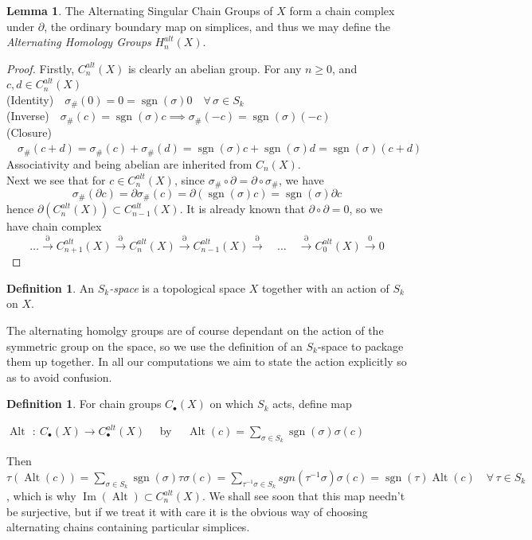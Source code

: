 \documentclass[11pt,a4paper,twoside]{article}
\theoremstyle{plain}
\theoremstyle{definition}
\newtheorem{defn}[thm]{Definition}
\theoremstyle{definition}
\newtheorem{lemma}[thm]{Lemma}
\theoremstyle{definition}
\theoremstyle{definition}
\theoremstyle{definition}
\DeclareMathOperator{\Ima}{Im}
\DeclareMathOperator{\co}{\!\colon\!}
\DeclareMathOperator{\Alt}{Alt}
\DeclareMathOperator{\sgn}{sgn}
\begin{document}
\begin{lemma}
\label{AlternatingSingularChainComplex}
The Alternating Singular Chain Groups of $X$ form a chain complex under $\partial$, the ordinary boundary map on simplices, and thus we may define the \emph{ Alternating Homology Groups} 
$H_{n}^{alt}(X)$.
\end{lemma}
\begin{proof}
Firstly, $C_n^{alt}(X)$ is clearly an abelian group. For any $n\geq0$, and $c,d\in C_n^{alt}(X)$\\
(Identity)$\quad\sigma_\#(0) = 0 = \sgn(\sigma) 0 \quad \forall \,\sigma \in S_k$ \\
(Inverse)$\quad\sigma_\#(c) = \sgn(\sigma)c  \implies \sigma_\#(-c) = \sgn(\sigma)(-c)$ \\
(Closure)$\quad\sigma_\#(c+d) = \sigma_\#(c) + \sigma_\#(d) = \sgn(\sigma)c + \sgn(\sigma)d = \sgn(\sigma)(c+d)$\\
Associativity and being abelian are inherited from $C_n(X)$.\\
Next we see that for $c \in C_n^{alt}(X)$, since $\sigma_\# \circ \partial = \partial \circ \sigma_\#$, we have 
$$\sigma_\#(\partial c) = \partial \sigma_\#(c) = \partial (\sgn(\sigma)c) = \sgn(\sigma)\partial c$$
hence $\partial(C_n^{alt}(X)) \subset C_{n-1}^{alt}(X)$. It is already known that $\partial \circ \partial = 0$, so we have chain complex
$$\dots \overset{\partial}{\longrightarrow}C_{n+1}^{alt}(X)\overset{\partial}{\longrightarrow}C_{n}^{alt}(X)\overset{\partial}{\longrightarrow}C_{n-1}^{alt}(X)\overset{\partial}{\longrightarrow}\quad \dots \quad \overset{\partial}{\longrightarrow}C_0^{alt}(X)\overset{0}{\longrightarrow}0$$
\end{proof}
\begin{defn}
An \emph{$S_k$-space} is a topological space $X$ together with an action of $S_k$ on $X$.
\end{defn}
The alternating homolgy groups are of course dependant on the action of the symmetric group on the space, so we use the definition of an $S_k$-space to package them up together. In all our computations we aim to state the action explicitly so as to avoid confusion. 


\begin{defn}
For chain groups $C_\bullet(X)$ on which $S_k$ acts, define map

\begin{center}$\Alt\co C_\bullet(X)\longrightarrow C_\bullet^{alt}(X)\quad$ by $\quad \Alt(c)=\underset{\sigma\in S_k}{\sum}\sgn(\sigma)\sigma(c) $ \end{center}
\end{defn} 
Then $\tau(\Alt(c))=\underset{\sigma\in S_k}{\sum}\sgn(\sigma)\tau\sigma(c)=\underset{\tau^{-1}\sigma\in S_k}{\sum}sgn(\tau^{-1}\sigma)\sigma(c)=\sgn(\tau)\Alt(c)\quad \forall\, \tau\in S_k$,
which is why $\Ima(\Alt)\subset C_n^{alt}(X)$. We shall see soon that this map needn't be surjective, but if we treat it with care it is the obvious way of choosing alternating chains containing particular simplices.
\end{document}
